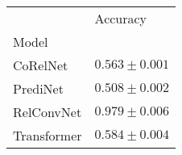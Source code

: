 \begin{tabular}{ll}
\toprule
{} &           Accuracy \\
Model       &                    \\
\midrule
CoRelNet    &  $0.563 \pm 0.001$ \\
PrediNet    &  $0.508 \pm 0.002$ \\
RelConvNet  &  $0.979 \pm 0.006$ \\
Transformer &  $0.584 \pm 0.004$ \\
\bottomrule
\end{tabular}
